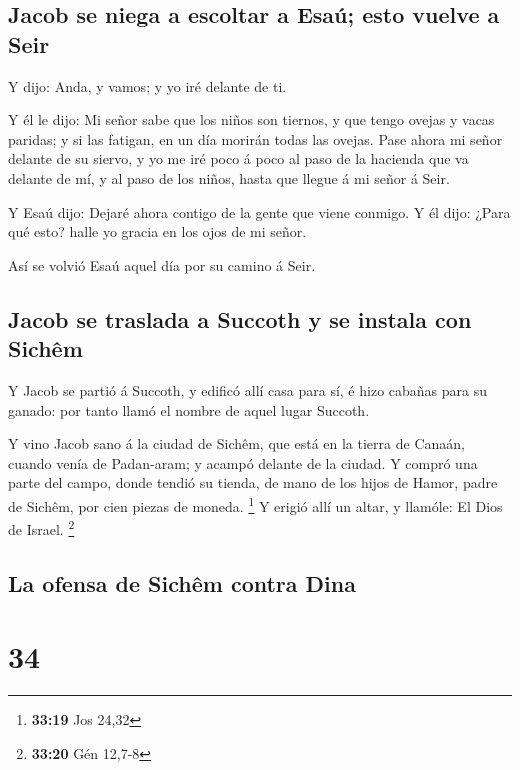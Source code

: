 \hypertarget{jacob-se-niega-a-escoltar-a-esauxfa-esto-vuelve-a-seir}{%
\subsection{Jacob se niega a escoltar a Esaú; esto vuelve a
Seir}\label{jacob-se-niega-a-escoltar-a-esauxfa-esto-vuelve-a-seir}}

 Y dijo: Anda, y vamos; y yo iré delante de ti.

 Y él le dijo: Mi señor sabe que los niños son tiernos, y
que tengo ovejas y vacas paridas; y si las fatigan, en un día morirán
todas las ovejas.  Pase ahora mi señor delante de su
siervo, y yo me iré poco á poco al paso de la hacienda que va delante de
mí, y al paso de los niños, hasta que llegue á mi señor á Seir.

 Y Esaú dijo: Dejaré ahora contigo de la gente que viene
conmigo. Y él dijo: ¿Para qué esto? halle yo gracia en los ojos de mi
señor.

 Así se volvió Esaú aquel día por su camino á Seir.

\hypertarget{jacob-se-traslada-a-succoth-y-se-instala-con-sichuxeam}{%
\subsection{Jacob se traslada a Succoth y se instala con
Sichêm}\label{jacob-se-traslada-a-succoth-y-se-instala-con-sichuxeam}}

 Y Jacob se partió á Succoth, y edificó allí casa para sí,
é hizo cabañas para su ganado: por tanto llamó el nombre de aquel lugar
Succoth.

 Y vino Jacob sano á la ciudad de Sichêm, que está en la
tierra de Canaán, cuando venía de Padan-aram; y acampó delante de la
ciudad.  Y compró una parte del campo, donde tendió su
tienda, de mano de los hijos de Hamor, padre de Sichêm, por cien piezas
de moneda. \footnote{\textbf{33:19} Jos 24,32}  Y erigió
allí un altar, y llamóle: El Dios de Israel. \footnote{\textbf{33:20}
  Gén 12,7-8}

\hypertarget{la-ofensa-de-sichuxeam-contra-dina}{%
\subsection{La ofensa de Sichêm contra
Dina}\label{la-ofensa-de-sichuxeam-contra-dina}}

\hypertarget{section-33}{%
\section{34}\label{section-33}}

